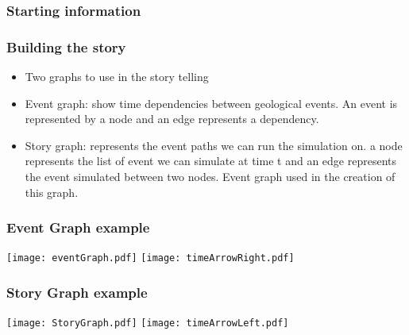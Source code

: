 \documentclass{beamer}
\begin{document}
	\begin{frame}
	\frametitle{Starting information}
	\end{frame}

	\begin{frame}
	\frametitle{Building the story}
	\begin{itemize}
	\item Two graphs to use in the story telling
	\item Event graph: show time dependencies between geological events. An event is represented by a node and an edge represents a dependency.
	\item Story graph: represents the event paths we can run the simulation on. a node represents the list of event we can simulate at time t and an edge represents the event simulated between two nodes. Event graph used in the creation of this graph.
	\end{itemize}
    \end{frame}	    
    
    \begin{frame} 
    \frametitle{Event Graph example}
    \texttt{[image: eventGraph.pdf]}
    \linebreak
    \linebreak
    \texttt{[image: timeArrowRight.pdf]}
    \end{frame}
    
    \begin{frame} 
    \frametitle{Story Graph example}
    \texttt{[image: StoryGraph.pdf]}
    \linebreak
    \linebreak
    \texttt{[image: timeArrowLeft.pdf]}
    \end{frame}
	
\end{document}
